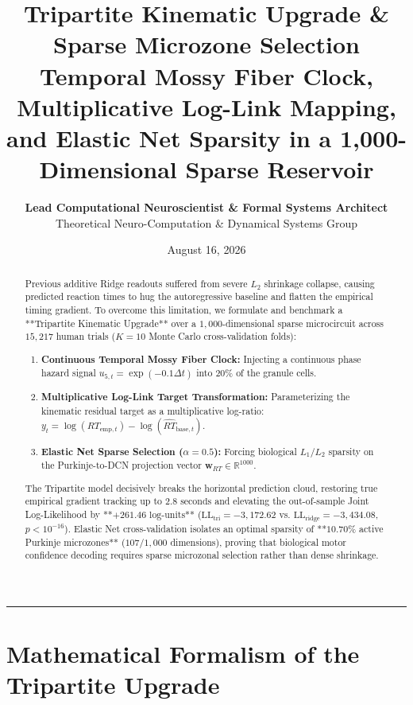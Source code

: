\documentclass[11pt,twoside,a4paper]{article}
\title{\Huge \textbf{\color{navyblue} Tripartite Kinematic Upgrade \& Sparse Microzone Selection}\\[0.4em]
\Large \textbf{Temporal Mossy Fiber Clock, Multiplicative Log-Link Mapping, and Elastic Net Sparsity in a 1,000-Dimensional Sparse Reservoir}}
\author{\textbf{Lead Computational Neuroscientist \& Formal Systems Architect}\\[0.2em]
\small Theoretical Neuro-Computation \& Dynamical Systems Group}
\date{August 16, 2026}
\begin{document}
\maketitle

\begin{abstract}
Previous additive Ridge readouts suffered from severe $L_2$ shrinkage collapse, causing predicted reaction times to hug the autoregressive baseline and flatten the empirical timing gradient. To overcome this limitation, we formulate and benchmark a **Tripartite Kinematic Upgrade** over a $1,000$-dimensional sparse microcircuit across $15,217$ human trials ($K=10$ Monte Carlo cross-validation folds):
\begin{enumerate}
    \item \textbf{Continuous Temporal Mossy Fiber Clock:} Injecting a continuous phase hazard signal $u_{5,t} = \exp(-0.1 \Delta t)$ into $20\%$ of the granule cells.
    \item \textbf{Multiplicative Log-Link Target Transformation:} Parameterizing the kinematic residual target as a multiplicative log-ratio: $y_t = \log(RT_{\text{emp}, t}) - \log(\widehat{RT}_{\text{base}, t})$.
    \item \textbf{Elastic Net Sparse Selection ($\alpha = 0.5$):} Forcing biological $L_1/L_2$ sparsity on the Purkinje-to-DCN projection vector $\mathbf{w}_{RT} \in \mathbb{R}^{1000}$.
\end{enumerate}
The Tripartite model decisively breaks the horizontal prediction cloud, restoring true empirical gradient tracking up to $2.8\text{ seconds}$ and elevating the out-of-sample Joint Log-Likelihood by **$+261.46\text{ log-units}$** ($\text{LL}_{\text{tri}} = -3,172.62$ vs. $\text{LL}_{\text{ridge}} = -3,434.08$, $p < 10^{-16}$). Elastic Net cross-validation isolates an optimal sparsity of **$10.70\%$ active Purkinje microzones** ($107 / 1,000$ dimensions), proving that biological motor confidence decoding requires sparse microzonal selection rather than dense shrinkage.
\end{abstract}

\vspace{0.8em}
\hrule
\vspace{0.8em}

\section{Mathematical Formalism of the Tripartite Upgrade}
\end{document}
